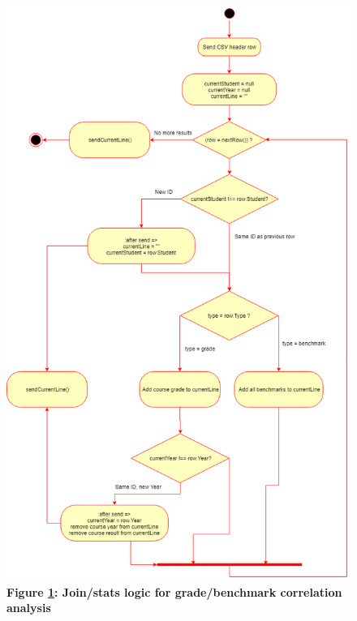 \begin{figure}[H]
    \centering
    \begin{mdframed}
        \centering
        \includegraphics[scale=0.5]{./resources/figures/fig-listfn-correlation-grades.png}
    \end{mdframed}
    \caption[Grade/Benchmark correlation list function]{\textbf{Figure \ref{fig-listfn-correlation-grades}: Join/stats logic for grade/benchmark correlation analysis}}
    \label{fig-listfn-correlation-grades}
\end{figure}
